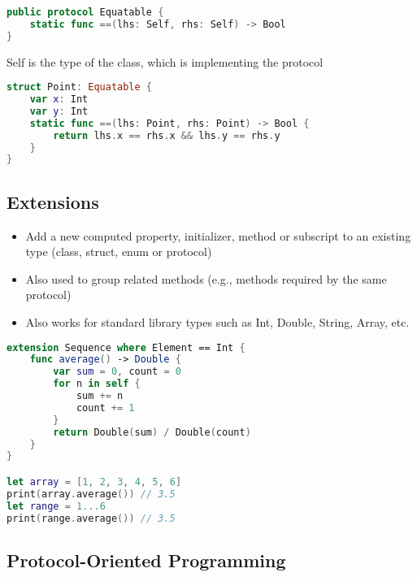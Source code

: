 \begin{breakbox}

\begin{lstlisting}[language=swift]
public protocol Equatable {
    static func ==(lhs: Self, rhs: Self) -> Bool
}
\end{lstlisting}
Self is the type of the class, which is implementing the protocol

\begin{lstlisting}[language=swift]
struct Point: Equatable {
    var x: Int
    var y: Int
    static func ==(lhs: Point, rhs: Point) -> Bool {
        return lhs.x == rhs.x && lhs.y == rhs.y
    }
}
\end{lstlisting}
\end{breakbox}

\subsection{Extensions}

\begin{breakbox}
\begin{itemize}
\tightlist
\item
  Add a new computed property, initializer, method or subscript to an
  existing type (class, struct, enum or protocol)
\item
  Also used to group related methods (e.g., methods required by the same
  protocol)
\item
  Also works for standard library types such as Int, Double, String,
  Array, etc.
\end{itemize}

\begin{lstlisting}[language=swift]
extension Sequence where Element == Int {
    func average() -> Double {
        var sum = 0, count = 0
        for n in self {
            sum += n
            count += 1
        }
        return Double(sum) / Double(count)
    }
}

let array = [1, 2, 3, 4, 5, 6]
print(array.average()) // 3.5
let range = 1...6
print(range.average()) // 3.5
\end{lstlisting}
\end{breakbox}


\subsection{Protocol-Oriented
Programming}

